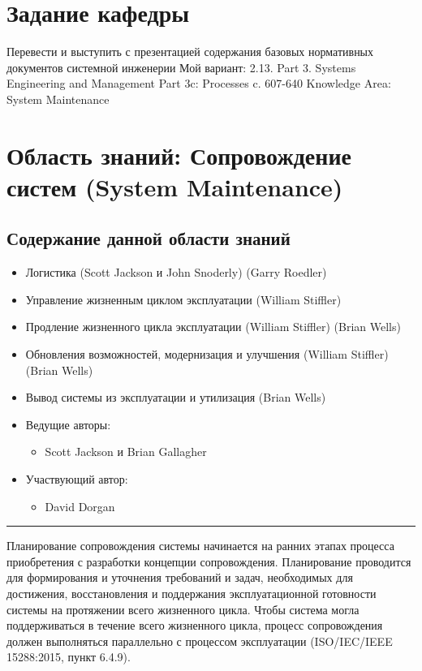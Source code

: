 \documentclass[14pt,a4paper]{extarticle}
\begin{document}
\section{Задание кафедры}
\begin{sloppypar}
    Перевести и выступить с презентацией содержания базовых нормативных документов системной инженерии
    Мой вариант: 2.13.
    Part 3. Systems Engineering and Management
    Part 3c: Processes c. 607-640
    Knowledge Area: System Maintenance
\end{sloppypar}

\section{Область знаний: Сопровождение систем (System Maintenance)}

\subsection{Содержание данной области знаний}

\begin{itemize}
\item Логистика (Scott Jackson и John Snoderly) (Garry Roedler)
\item Управление жизненным циклом эксплуатации (William Stiffler)
\item Продление жизненного цикла эксплуатации (William Stiffler) (Brian Wells)
\item Обновления возможностей, модернизация и улучшения (William Stiffler) (Brian Wells)
\item Вывод системы из эксплуатации и утилизация (Brian Wells)
\item Ведущие авторы:
    \begin{itemize}
        \item Scott Jackson и Brian Gallagher
    \end{itemize}
\item Участвующий автор:
    \begin{itemize}
        \item David Dorgan
    \end{itemize}
\end{itemize}

\hrule

Планирование сопровождения системы начинается на ранних этапах процесса приобретения с разработки концепции сопровождения. Планирование проводится для формирования и уточнения требований и задач, необходимых для достижения, восстановления и поддержания эксплуатационной готовности системы на протяжении всего жизненного цикла. Чтобы система могла поддерживаться в течение всего жизненного цикла, процесс сопровождения должен выполняться параллельно с процессом эксплуатации (ISO/IEC/IEEE 15288:2015, пункт 6.4.9).
\end{document}
